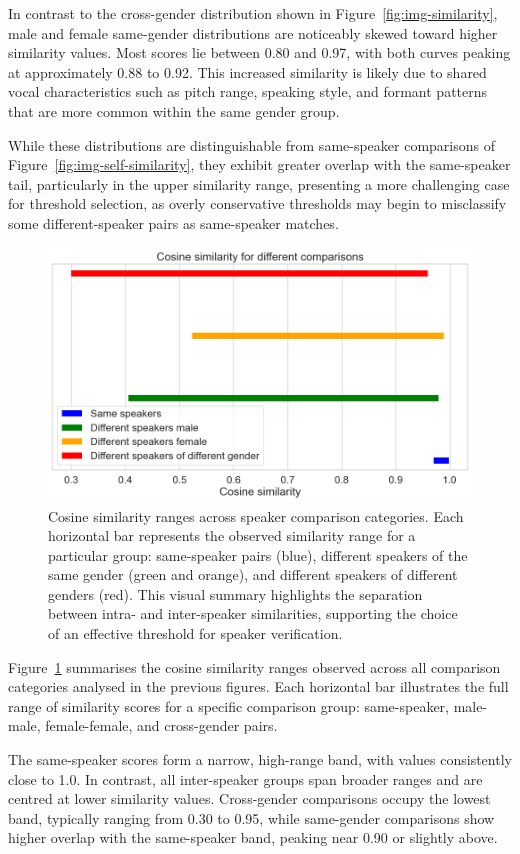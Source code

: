\documentclass[conference]{IEEEtran}
\begin{document}
In contrast to the cross-gender distribution shown in Figure~\ref{fig:img-similarity}, male and female same-gender distributions are noticeably skewed toward higher similarity values. Most scores lie between 0.80 and 0.97, with both curves peaking at approximately 0.88 to 0.92. This increased similarity is likely due to shared vocal characteristics such as pitch range, speaking style, and formant patterns that are more common within the same gender group.

While these distributions are distinguishable from same-speaker comparisons of Figure~\ref{fig:img-self-similarity}, they exhibit greater overlap with the same-speaker tail, particularly in the upper similarity range, presenting a more challenging case for threshold selection, as overly conservative thresholds may begin to misclassify some different-speaker pairs as same-speaker matches.

\begin{figure}[H]
	\centering
	\includegraphics[width=0.7\linewidth]{img/img-similarity-comparison}
	\caption{Cosine similarity ranges across speaker comparison categories. Each horizontal bar represents the observed similarity range for a particular group: same-speaker pairs (blue), different speakers of the same gender (green and orange), and different speakers of different genders (red). This visual summary highlights the separation between intra- and inter-speaker similarities, supporting the choice of an effective threshold for speaker verification.}
	\label{fig:img-similarity-comparison}
\end{figure}

Figure~\ref{fig:img-similarity-comparison} summarises the cosine similarity ranges observed across all comparison categories analysed in the previous figures. Each horizontal bar illustrates the full range of similarity scores for a specific comparison group: same-speaker, male-male, female-female, and cross-gender pairs.

The same-speaker scores form a narrow, high-range band, with values consistently close to 1.0. In contrast, all inter-speaker groups span broader ranges and are centred at lower similarity values. Cross-gender comparisons occupy the lowest band, typically ranging from 0.30 to 0.95, while same-gender comparisons show higher overlap with the same-speaker band, peaking near 0.90 or slightly above.
\end{document}
